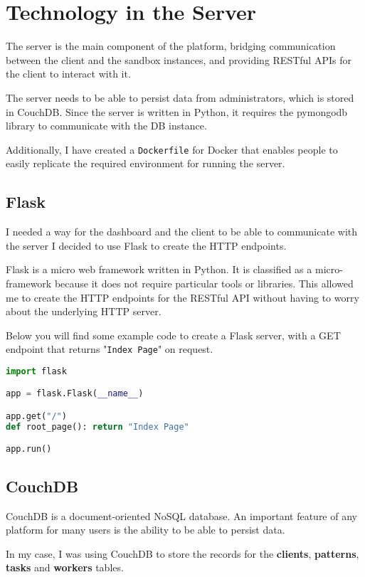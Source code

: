 \section{Technology in the Server}
The server is the main component of the platform,
bridging communication between the client and the sandbox instances, 
and providing RESTful APIs for the client to interact with it.

The server needs to be able to persist data from administrators, 
which is stored in CouchDB. Since the server is written in Python,
it requires the pymongodb library to communicate with the DB instance.

Additionally, I have created a \texttt{Dockerfile} for Docker
that enables people to easily replicate the required
environment for running the server.

\subsection{Flask}
I needed a way for the dashboard and the client to be
able to communicate with the server
I decided to use Flask to create the HTTP endpoints.

Flask is a micro web framework written in Python.
It is classified as a micro-framework because it does
not require particular tools or libraries.
This allowed me to create the HTTP endpoints for the RESTful API without
having to worry about the underlying HTTP server.

Below you will find some example code to create a Flask server,
with a GET endpoint that returns "\texttt{Index Page}" on request.

\begin{lstlisting}[language=Python]
import flask

app = flask.Flask(__name__)

app.get("/")
def root_page(): return "Index Page"

app.run()
\end{lstlisting}

\subsection{CouchDB}
CouchDB is a document-oriented NoSQL database.
An important feature of any platform for many users is the
ability to be able to persist data.

In my case, I was using CouchDB to store the records for the
\textbf{clients}, \textbf{patterns}, \textbf{tasks} and \textbf{workers} tables.


